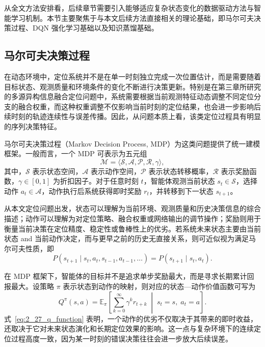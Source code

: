 从全文方法安排看，后续章节需要引入能够适应复杂状态变化的数据驱动方法与智能学习机制。本节主要聚焦于与本文后续方法直接相关的理论基础，即马尔可夫决策过程、DQN 强化学习基础以及知识蒸馏基础。

\subsection{马尔可夫决策过程}
\label{subsec:2_4_1}

在动态环境中，定位系统并不是在单一时刻独立完成一次位置估计，而是需要随着目标状态、观测质量和环境条件的变化不断进行决策更新。特别是在第三章所研究的多源异构信息融合定位问题中，系统需要根据当前观测特征动态调整不同定位分支的融合权重，而这种权重调整不仅影响当前时刻的定位结果，也会进一步影响后续时刻的轨迹连续性与误差传播。因此，从问题本质上看，该类定位过程具有明显的序列决策特征。

马尔可夫决策过程（Markov Decision Process, MDP）为这类问题提供了统一建模框架。一般而言，一个 MDP 可表示为五元组
\begin{equation}
\mathcal{M}
=
\langle
\mathcal{S},
\mathcal{A},
\mathcal{P},
\mathcal{R},
\gamma
\rangle,
\label{eq:2_25_mdp_tuple}
\end{equation}
其中，$\mathcal{S}$ 表示状态空间，$\mathcal{A}$ 表示动作空间，$\mathcal{P}$ 表示状态转移概率，$\mathcal{R}$ 表示奖励函数，$\gamma\in[0,1]$ 为折扣因子。对于任意时刻 $t$，智能体观测当前状态 $s_t\in\mathcal{S}$，选择动作 $a_t\in\mathcal{A}$，动作执行后系统获得即时奖励 $r_t$，并转移到下一状态 $s_{t+1}$。

从本文定位问题出发，状态可以理解为当前环境、观测质量和历史决策信息的综合描述；动作可以理解为对定位策略、融合权重或网络输出的调节操作；奖励则用于衡量当前决策在定位精度、稳定性或鲁棒性上的优劣。若系统未来状态主要由当前状态 and 当前动作决定，而与更早之前的历史无直接关系，则可近似视为满足马尔可夫性质，即
\begin{equation}
P(s_{t+1}\mid s_t,a_t,s_{t-1},a_{t-1},\dots)
=
P(s_{t+1}\mid s_t,a_t).
\label{eq:2_26_markov_property}
\end{equation}

在 MDP 框架下，智能体的目标并不是追求单步奖励最大，而是寻求长期累计回报最大。设策略 $\pi$ 表示状态到动作的映射，则对应的状态—动作价值函数可写为
\begin{equation}
Q^{\pi}(s,a)
=
\mathbb{E}_{\pi}
\left[
\sum_{k=0}^{\infty}\gamma^k r_{t+k}
\;\middle|\;
s_t=s,\; a_t=a
\right].
\label{eq:2_27_q_function}
\end{equation}
式~\eqref{eq:2_27_q_function} 表明，一个动作的优劣不仅取决于其带来的即时收益，还取决于它对未来状态演化和长期定位效果的影响。这一点与复杂环境下的连续定位过程高度一致，因为某一时刻的错误决策往往会进一步放大后续误差。


